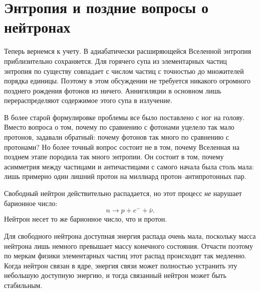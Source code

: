 \section{Энтропия и поздние вопросы о нейтронах}

Теперь вернемся к учету. В адиабатически расширяющейся Вселенной энтропия приблизительно сохраняется. Для горячего супа из элементарных частиц энтропия по существу совпадает с числом частиц с точностью до множителей порядка единицы. Поэтому в этом обсуждении не требуется никакого огромного позднего рождения фотонов из ничего. Аннигиляции в основном лишь перераспределяют содержимое этого супа в излучение.

В более старой формулировке проблемы все было поставлено с ног на голову. Вместо вопроса о том, почему по сравнению с фотонами уцелело так мало протонов, задавали обратный: почему фотонов так много по сравнению с протонами? Но более точный вопрос состоит не в том, почему Вселенная на позднем этапе породила так много энтропии. Он состоит в том, почему асимметрия между частицами и античастицами с самого начала была столь мала: лишь примерно один лишний протон на миллиард протон--антипротонных пар.

Свободный нейтрон действительно распадается, но этот процесс \emph{не} нарушает барионное число:
\[
n \to p + e^- + \bar\nu.
\]
Нейтрон несет то же барионное число, что и протон.

Для свободного нейтрона доступная энергия распада очень мала, поскольку масса нейтрона лишь немного превышает массу конечного состояния. Отчасти поэтому по меркам физики элементарных частиц этот распад происходит так медленно. Когда нейтрон связан в ядре, энергия связи может полностью устранить эту небольшую доступную энергию, и тогда связанный нейтрон может быть стабильным.

\begin{classroomqa}
\end{classroomqa}
